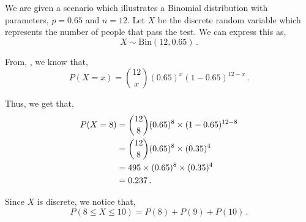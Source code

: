 %
%


\begin{subquestions}
	
\subquestion

We are given a scenario which illustrates a Binomial distribution with parameters, $p = 0.65$ and $n=12$. Let $X$ be the discrete random variable which represents the number of people that pass the test. We can express this as,
\begin{equation}
	X \sim \text{Bin}(12,0.65) \,.
\end{equation}

\begin{subsubquestions}
	
\subsubquestion

\begin{subsubsubquestions}
	
\subsubsubquestion

From, , we know that,
\begin{equation}
	P(X = x) = { 12 \choose x} (0.65)^x (1-0.65)^{12-x} \,. \label{2009:q4:BinEqn1}
\end{equation}
	
Thus, we get that,
\begin{align}
	P(X=8) & = { 12 \choose 8} (0.65)^8 \times (1-0.65)^{12-8} \nonumber \\
		   & = { 12 \choose 8} (0.65)^8 \times (0.35)^{4} \nonumber \\
		   & = 495 \times (0.65)^8 \times (0.35)^{4} \nonumber \\
		   & = 0.237 \,.
\end{align}


\subsubsubquestion

Since $X$ is discrete, we notice that,
\begin{equation}
	P(8\leq X \leq 10) = P(8)+P(9)+P(10) \,.
\end{equation}


\end{subsubsubquestions}
\end{subsubquestions}
\end{subquestions}
